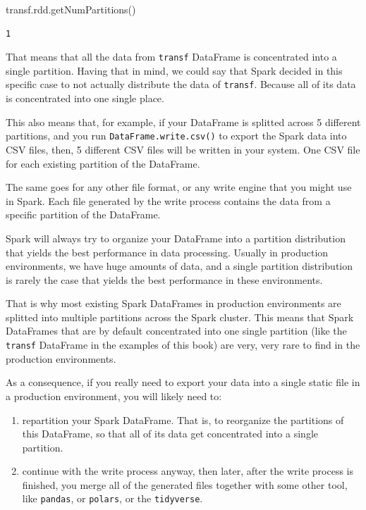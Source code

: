 \documentclass[
  11pt,
  letterpaper,
  DIV=11,
  numbers=noendperiod]{scrreprt}
\newenvironment{Shaded}{\begin{snugshade}}{\end{snugshade}}
\newcommand{\NormalTok}[1]{\textcolor[rgb]{0.00,0.23,0.31}{#1}}
\providecommand{\tightlist}{%
  \setlength{\itemsep}{0pt}\setlength{\parskip}{0pt}}\usepackage{longtable,booktabs,array}
\begin{document}
\begin{Shaded}
\begin{Highlighting}[]
\NormalTok{transf.rdd.getNumPartitions()}
\end{Highlighting}
\end{Shaded}

\begin{verbatim}
1
\end{verbatim}

That means that all the data from \texttt{transf} DataFrame is
concentrated into a single partition. Having that in mind, we could say
that Spark decided in this specific case to not actually distribute the
data of \texttt{transf}. Because all of its data is concentrated into
one single place.

This also means that, for example, if your DataFrame is splitted across
5 different partitions, and you run \texttt{DataFrame.write.csv()} to
export the Spark data into CSV files, then, 5 different CSV files will
be written in your system. One CSV file for each existing partition of
the DataFrame.

The same goes for any other file format, or any write engine that you
might use in Spark. Each file generated by the write process contains
the data from a specific partition of the DataFrame.

Spark will always try to organize your DataFrame into a partition
distribution that yields the best performance in data processing.
Usually in production environments, we have huge amounts of data, and a
single partition distribution is rarely the case that yields the best
performance in these environments.

That is why most existing Spark DataFrames in production environments
are splitted into multiple partitions across the Spark cluster. This
means that Spark DataFrames that are by default concentrated into one
single partition (like the \texttt{transf} DataFrame in the examples of
this book) are very, very rare to find in the production environments.

As a consequence, if you really need to export your data into a single
static file in a production environment, you will likely need to:

\begin{enumerate}
\def\labelenumi{\arabic{enumi}.}
\tightlist
\item
  repartition your Spark DataFrame. That is, to reorganize the
  partitions of this DataFrame, so that all of its data get concentrated
  into a single partition.
\item
  continue with the write process anyway, then later, after the write
  process is finished, you merge all of the generated files together
  with some other tool, like \texttt{pandas}, or \texttt{polars}, or the
  \texttt{tidyverse}.
\end{enumerate}
\end{document}
